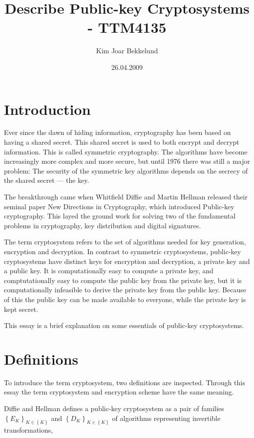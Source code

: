 \documentclass[english,titlepage,11pt]{article}
\begin{document}
\title{Describe Public-key Cryptosystems - TTM4135}
\author{Kim Joar Bekkelund}
\date{26.04.2009}

\maketitle

\section{Introduction}

Ever since the dawn of hiding information, cryptography has been based on having a shared secret. This shared secret is used to both encrypt and decrypt information. This is called symmetric cryptography. The algorithms have become increasingly more complex and more secure, but until 1976 there was still a major problem: The security of the symmetric key algorithms depends on the secrecy of the shared secret --- the key.

The breakthrough came when Whitfield Diffie and Martin Hellman released their seminal paper New Directions in Cryptography, which introduced Public-key cryptography. This layed the ground work for solving two of the fundamental problems in cryptography, key distribution and digital signatures.

The term cryptosystem refers to the set of algorithms needed for key generation, encryption and decryption. In contrast to symmetric cryptosystems, public-key cryptosystems have distinct keys for encryption and decryption, a private key and a public key. It is computationally easy to compute a private key, and comptutationally easy to compute the public key from the private key, but it is computationally infeasible to derive the private key from the public key. Because of this the public key can be made available to everyone, while the private key is kept secret.

This essay is a brief explanation on some essentials of public-key cryptosystems.

\section{Definitions}

To introduce the term cryptosystem, two definitions are inspected. Through this essay the term cryptosystem and encryption scheme have the same meaning.

Diffie and Hellman defines\cite{diffie76} a public-key cryptosystem as a pair of families $\left \{ E_K \right \}_{K\in \left \{ K \right \}}$ and $\left \{ D_K \right \}_{K\in \left \{ K \right \}}$ of algorithms representing invertible transformations,
\end{document}
